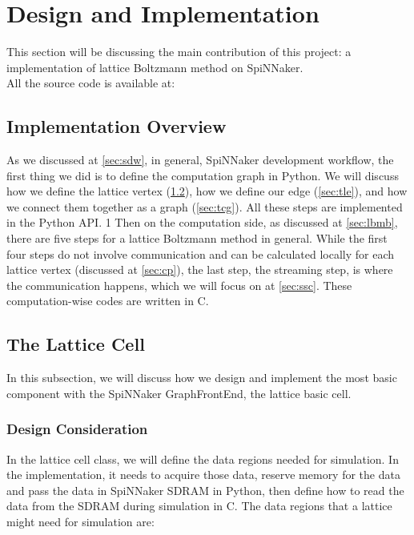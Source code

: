 

\newpage
\section{Design and Implementation} \label{sec:dai}
This section will be discussing the main contribution of this project: a implementation of lattice Boltzmann method on SpiNNaker.  \\

All the source code is available at: \cite{spinn_lb}
\subsection{Implementation Overview}

As we discussed at \ref{sec:sdw}, in general, SpiNNaker development workflow, the first thing we did is to define the computation graph in Python. We will discuss how we define the lattice vertex (\ref{sec:tlc}), how we define our edge (\ref{sec:tle}), and how we connect them together as a graph (\ref{sec:tcg}). All these steps are implemented in the Python API.
1       
Then on the computation side, as discussed at \ref{sec:lbmb}, there are five steps for a lattice Boltzmann method in general. While the first four steps do not involve communication and can be calculated locally for each lattice vertex (discussed at \ref{sec:cp}), the last step, the streaming step, is where the communication happens, which we will focus on at \ref{sec:ssc}. These computation-wise codes are written in C.

\subsection{The Lattice Cell} \label{sec:tlc}
In this subsection, we will discuss how we design and implement the most basic component with the SpiNNaker GraphFrontEnd, the lattice basic cell.
\subsubsection{Design Consideration} \label{sec:tlcdc}
In the lattice cell class, we will define the data regions needed for simulation. In the implementation, it needs to acquire those data, reserve memory for the data and pass the data in SpiNNaker SDRAM in Python, then define how to read the data from the SDRAM during simulation in C. The data regions that a lattice might need for simulation are: \\

